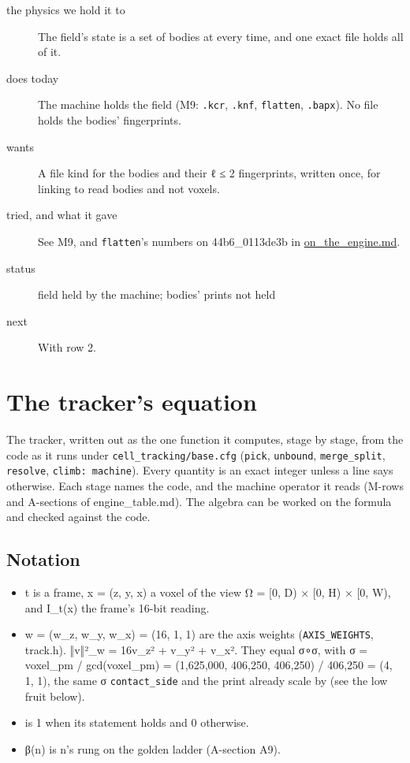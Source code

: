 \begin{description}
\item[{the physics we hold it to}] The field's state is a set of bodies at every time, and one exact file holds all of it.
\item[{does today}] The machine holds the field (M9: \texttt{.\allowbreak{}kcr}, \texttt{.\allowbreak{}knf}, \texttt{flatten}, \texttt{.\allowbreak{}bapx}). No file holds the bodies' fingerprints.
\item[{wants}] A file kind for the bodies and their ℓ ≤ 2 fingerprints, written once, for linking to read bodies and not voxels.
\item[{tried, and what it gave}] See M9, and \texttt{flatten}'s numbers on 44b6\_\allowbreak{}0113de3b in \hyperref[chap:on-the-engine]{on\_\allowbreak{}the\_\allowbreak{}engine.md}.
\item[{status}] field held by the machine; bodies' prints not held
\item[{next}] With row 2.
\end{description}

\section{\texorpdfstring{The tracker's equation}{The tracker's equation}}

The tracker, written out as the one function it computes, stage by stage, from the code as it runs under \texttt{cell\_\allowbreak{}tracking/\allowbreak{}base.\allowbreak{}cfg} (\texttt{pick}, \texttt{unbound}, \texttt{merge\_\allowbreak{}split}, \texttt{resolve}, \texttt{climb: machine}). Every quantity is an exact integer unless a line says otherwise. Each stage names the code, and the machine operator it reads (M-rows and A-sections of engine\_\allowbreak{}table.md). The algebra can be worked on the formula and checked against the code.

\subsection{\texorpdfstring{Notation}{Notation}}

\begin{itemize}
\item t is a frame, x = (z, y, x) a voxel of the view Ω = [0, D) × [0, H) × [0, W), and I\_\allowbreak{}t(x) the frame's 16-bit reading.
\item w = (w\_\allowbreak{}z, w\_\allowbreak{}y, w\_\allowbreak{}x) = (16, 1, 1) are the axis weights (\texttt{AXIS\_\allowbreak{}WEIGHTS}, track.h). ‖v‖²\_\allowbreak{}w = 16v\_\allowbreak{}z² + v\_\allowbreak{}y² + v\_\allowbreak{}x². They equal σ∘σ, with σ = voxel\_\allowbreak{}pm / gcd(voxel\_\allowbreak{}pm) = (1,625,000, 406,250, 406,250) / 406,250 = (4, 1, 1), the same σ \texttt{contact\_\allowbreak{}side} and the print already scale by (see the low fruit below).
\item [·] is 1 when its statement holds and 0 otherwise.
\item β(n) is n's rung on the golden ladder (A-section A9).
\end{itemize}

